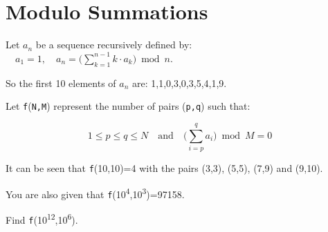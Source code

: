 \section[Problem \#326: Modulo Summations]{Modulo Summations}
\label{sec:problem_326}

Let $a_n$ be a sequence recursively defined
by:$\quad a_1=1,\quad\displaystyle a_n=\biggl(\sum_{k=1}^{n-1}k\cdot a_k\biggr)\bmod n$.

So the first 10 elements of $a_n$ are:
1,1,0,3,0,3,5,4,1,9.

Let \texttt{f}(\texttt{N,M}) represent the number of pairs
(\texttt{p,q}) such that:

$$
1\le p\le q\le N \quad\text{and}\quad\biggl(\sum_{i=p}^qa_i\biggr)\bmod M=0
$$

It can be seen that \texttt{f}(10,10)=4 with the pairs (3,3), (5,5),
(7,9) and (9,10).

You are also given that
\texttt{f}(10\textsuperscript{4},10\textsuperscript{3})=97158.

Find \texttt{f}(10\textsuperscript{12},10\textsuperscript{6}).